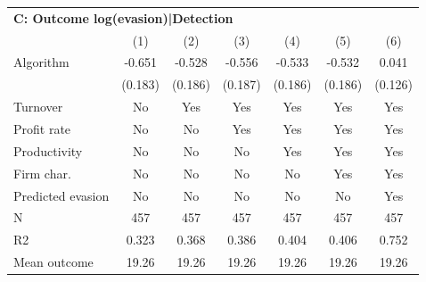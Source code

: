 \begin{tabular}{lcccccc}
\midrule \multicolumn{7}{l}{\textbf{C: Outcome log(evasion)|Detection}} \\ \multicolumn{1}{l}{} & (1) & (2) & (3) & (4) & (5) & (6) \\ \midrule
Algorithm   &      -0.651\sym{***}&      -0.528\sym{***}&      -0.556\sym{***}&      -0.533\sym{***}&      -0.532\sym{***}&       0.041         \\
            &     (0.183)         &     (0.186)         &     (0.187)         &     (0.186)         &     (0.186)         &     (0.126)         \\
\midrule
Turnover    &          No         &         Yes         &         Yes         &         Yes         &         Yes         &         Yes         \\
Profit rate &          No         &          No         &         Yes         &         Yes         &         Yes         &         Yes         \\
Productivity&          No         &          No         &          No         &         Yes         &         Yes         &         Yes         \\
Firm char.  &          No         &          No         &          No         &          No         &         Yes         &         Yes         \\
Predicted evasion&          No         &          No         &          No         &          No         &          No         &         Yes         \\
N           &         457         &         457         &         457         &         457         &         457         &         457         \\
R2          &       0.323         &       0.368         &       0.386         &       0.404         &       0.406         &       0.752         \\
Mean outcome&       19.26         &       19.26         &       19.26         &       19.26         &       19.26         &       19.26         \\
\bottomrule \end{tabular}
